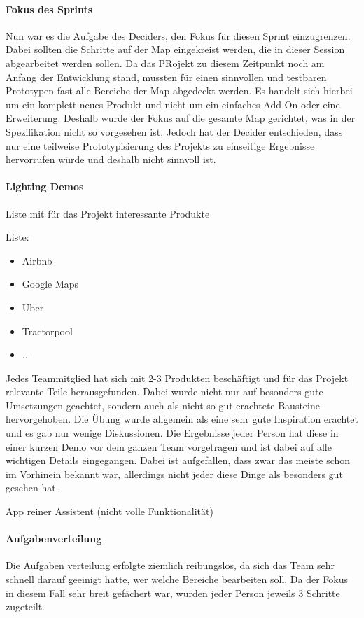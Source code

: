 \paragraph{Fokus des Sprints}
Nun war es die Aufgabe des Deciders, den Fokus für diesen Sprint einzugrenzen. Dabei sollten die Schritte auf der Map eingekreist werden, die in dieser Session abgearbeitet werden sollen. Da das PRojekt zu diesem Zeitpunkt noch am Anfang der Entwicklung stand, mussten für einen sinnvollen und testbaren Prototypen fast alle Bereiche der Map abgedeckt werden. Es handelt sich hierbei um ein komplett neues Produkt und nicht um ein einfaches Add-On oder eine Erweiterung. Deshalb wurde der Fokus auf die gesamte Map gerichtet, was in der Spezifikation nicht so vorgesehen ist. Jedoch hat der Decider entschieden, dass nur eine teilweise Prototypisierung des Projekts zu einseitige Ergebnisse hervorrufen würde und deshalb nicht sinnvoll ist.

\paragraph{Lighting Demos}
Liste mit für das Projekt interessante Produkte

Liste:
\begin{itemize}
	\item Airbnb
	\item Google Maps
	\item Uber
	\item Tractorpool
	\item ...
\end{itemize}

Jedes Teammitglied hat sich mit 2-3 Produkten beschäftigt und für das Projekt relevante Teile herausgefunden. Dabei wurde nicht nur auf besonders gute Umsetzungen geachtet, sondern auch als nicht so gut erachtete Bausteine hervorgehoben. 
Die Übung wurde allgemein als eine sehr gute Inspiration erachtet und es gab nur wenige Diskussionen. 
Die Ergebnisse jeder Person hat diese in einer kurzen Demo vor dem ganzen Team vorgetragen und ist dabei auf alle wichtigen Details eingegangen. 
Dabei ist aufgefallen, dass zwar das meiste schon im Vorhinein bekannt war, allerdings nicht jeder diese Dinge als besonders gut gesehen hat.

App reiner Assistent (nicht volle Funktionalität)


\paragraph{Aufgabenverteilung}
Die Aufgaben verteilung erfolgte ziemlich reibungslos, da sich das Team sehr schnell darauf geeinigt hatte, wer welche Bereiche bearbeiten soll. Da der Fokus in diesem Fall sehr breit gefächert war, wurden jeder Person jeweils 3 Schritte zugeteilt.

